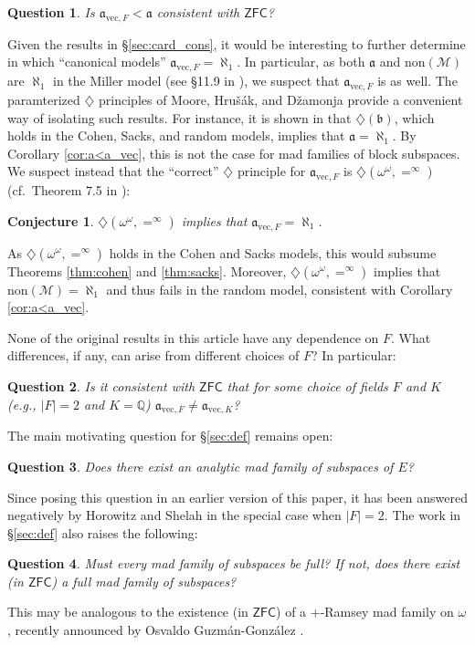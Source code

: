 \documentclass[11pt]{amsart}
\newcommand{\Q}{\mathbb{Q}}
\newcommand{\LM}{\mathcal{M}}
\renewcommand{\b}{\mathfrak{b}}
\renewcommand{\a}{\mathfrak{a}}
\newtheorem*{ques}{Question}
\newtheorem*{conj}{Conjecture}
\theoremstyle{definition}
\theoremstyle{remark}
\newcommand{\ZFC}{\mathsf{ZFC}}
\renewcommand{\1}{\mathbf{1}}
\begin{document}
\begin{ques}
	Is $\a_{\mathrm{vec},F}<\a$ consistent with $\ZFC$?
\end{ques}

Given the results in \S\ref{sec:card_cons}, it would be interesting to further determine in which ``canonical models'' $\a_{\mathrm{vec},F}=\aleph_1$. In particular, as both $\a$ and $\mathrm{non}(\LM)$ are $\aleph_1$ in the Miller model (see \S11.9 in \cite{MR2768685}), we suspect that $\a_{\mathrm{vec},F}$ is as well. The paramterized $\diamondsuit$ principles of Moore, Hru\v{s}\'{a}k, and D\v{z}amonja \cite{MR2048518} provide a convenient way of isolating such results. For instance, it is shown in \cite{MR2048518} that $\diamondsuit(\b)$, which holds in the Cohen, Sacks, and random models, implies that $\a=\aleph_1$. By Corollary \ref{cor:a<a_vec}, this is not the case for mad families of block subspaces. We suspect instead that the ``correct'' $\diamondsuit$ principle for $\a_{\mathrm{vec},F}$ is $\diamondsuit(\omega^\omega,=^\infty)$ (cf.~Theorem 7.5 in \cite{MR2048518}):

\begin{conj}
	$\diamondsuit(\omega^\omega,=^\infty)$ implies that $\a_{\mathrm{vec},F}=\aleph_1$.
\end{conj}

As $\diamondsuit(\omega^\omega,=^\infty)$ holds in the Cohen and Sacks models, this would subsume Theorems \ref{thm:cohen} and \ref{thm:sacks}. Moreover, $\diamondsuit(\omega^\omega,=^\infty)$ implies that $\mathrm{non}(\LM)=\aleph_1$ and thus fails in the random model, consistent with Corollary \ref{cor:a<a_vec}.

None of the original results in this article have any dependence on $F$. What differences, if any, can arise from different choices of $F$? In particular:

\begin{ques}
	Is it consistent with $\ZFC$ that for some choice of fields $F$ and $K$ (e.g., $|F|=2$ and $K=\Q$) $\a_{\mathrm{vec},F}\neq\a_{\mathrm{vec},K}$?
\end{ques}

The main motivating question for \S\ref{sec:def} remains open:

\begin{ques}
	Does there exist an analytic mad family of subspaces of $E$?
\end{ques}

Since posing this question in an earlier version of this paper, it has been answered negatively by Horowitz and Shelah \cite{Horowitz_Shelah_no_mad_vec} in the special case when $|F|=2$. The work in \S\ref{sec:def} also raises the following:

\begin{ques}
	Must every mad family of subspaces be full? If not, does there exist (in $\ZFC$) a full mad family of subspaces?	
\end{ques}

This may be analogous to the existence (in $\ZFC$) of a +-Ramsey mad family on $\omega$, recently announced by Osvaldo Guzm\'{a}n-Gonz\'{a}lez \cite{guzman_ramsey_mad}.

{}

\end{document}
